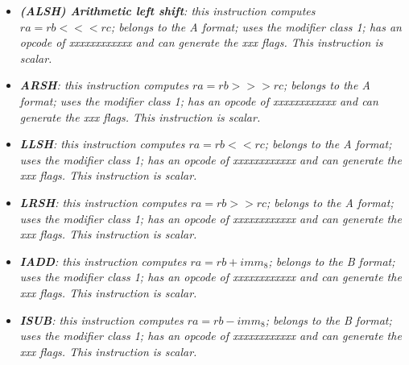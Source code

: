 \begin{multicols}{2}
\begin{itemize}
                \item \textit{\textbf{(ALSH) Arithmetic left shift}: this instruction computes \(ra = rb <<< rc\); belongs to the A format; uses the modifier class 1; has an opcode of xxxxxxxxxxxx and can generate the xxx flags. This instruction is scalar.}

                \item \textit{\textbf{ARSH}: this instruction computes \(ra = rb >>> rc\); belongs to the A format; uses the modifier class 1; has an opcode of xxxxxxxxxxxx and can generate the xxx flags. This instruction is scalar.}

                \item \textit{\textbf{LLSH}: this instruction computes \(ra = rb << rc\); belongs to the A format; uses the modifier class 1; has an opcode of xxxxxxxxxxxx and can generate the xxx flags. This instruction is scalar.}

                \item \textit{\textbf{LRSH}: this instruction computes \(ra = rb >> rc\); belongs to the A format; uses the modifier class 1; has an opcode of xxxxxxxxxxxx and can generate the xxx flags. This instruction is scalar.}

                \item \textit{\textbf{IADD}: this instruction computes \(ra = rb + imm_8\); belongs to the B format; uses the modifier class 1; has an opcode of xxxxxxxxxxxx and can generate the xxx flags. This instruction is scalar.}

                \item \textit{\textbf{ISUB}: this instruction computes \(ra = rb - imm_8\); belongs to the B format; uses the modifier class 1; has an opcode of xxxxxxxxxxxx and can generate the xxx flags. This instruction is scalar.}








\end{itemize}
\end{multicols}

